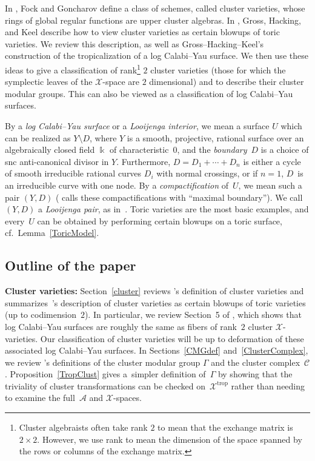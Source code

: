 \documentclass[pdftex]{sigma}
\numberwithin{equation}{section}
\numberwithin{figure}{section}
\numberwithin{table}{section}
\DeclareMathOperator{\trop}{trop}
\let\s=\mathcal
\newcommand {\kk} {\Bbbk}
\theoremstyle{definition}
\begin{document}
In \cite{FG1}, Fock and Goncharov define a class of schemes, called cluster varieties, whose rings of global regular functions are upper cluster algebras. In \cite{GHK3}, Gross, Hacking, and Keel describe how to view cluster varieties as certain blowups of toric varieties. We review this description, as well as Gross--Hacking--Keel's construction \cite{GHK1} of the tropicalization of a log Calabi--Yau surface. We then use these ideas to give a classification of rank\footnote{Cluster algebraists often take rank $2$ to mean that the exchange matrix is $2\times 2$. However, we use rank to mean the dimension of the space spanned by the rows or columns of the exchange matrix.} $2$ cluster varieties (those for which the symplectic leaves of the $\s{X}$-space are $2$ dimensional) and to describe their cluster modular groups. This can also be viewed as a classification of log Calabi--Yau surfaces.

By a {\it log Calabi--Yau surface} or a {\it Looijenga interior}, we mean a surface $U$ which can be realized as $Y\setminus D$, where $Y$ is a smooth, projective, rational surface over an algebraically closed field $\kk$ of characteristic~$0$, and the {\it boundary}~$D$ is a choice of snc anti-canonical divisor in $Y$. Furthermore, $D=D_1+\cdots + D_n$ is either a cycle of smooth irreducible rational curves $D_i$ with normal crossings, or if $n=1$, $D$~is an irreducible curve with one node. By a {\it compactification} of~$U$, we mean such a pair $(Y,D)$ (\cite{GHK2} calls these compactifications with ``maximal boundary''). We call $(Y,D)$ a {\it Looijenga pair}, as in~\cite{GHK1}. Toric varieties are the most basic examples, and every~$U$ can be obtained by performing certain blowups on a toric surface, cf.\ Lemma~\ref{ToricModel}.

\subsection{Outline of the paper}

{\bf Cluster varieties:} Section~\ref{cluster} reviews \cite{FG1}'s definition of cluster varieties and summarizes~\cite{GHK3}'s description of cluster varieties as certain blowups of toric varieties (up to codimension~$2$). In particular, we review Section~5 of \cite{GHK3}, which shows that log Calabi--Yau surfaces are roughly the same as fibers of rank~$2$ cluster $\s{X}$-varieties. Our classification of cluster varieties will be up to deformation of these associated log Calabi--Yau surfaces. In Sections~\ref{CMGdef} and~\ref{ClusterComplex}, we review \cite{FG1}'s definitions of the cluster modular group $\Gamma$ and the cluster complex~$\s{C}$. Proposition~\ref{TropClust} gives a~simpler definition of~$\Gamma$ by showing that the triviality of cluster transformations can be checked on~$\s{X}^{\trop}$ rather than needing to examine the full~$\s{A}$ and $\s{X}$-spaces.
\end{document}
